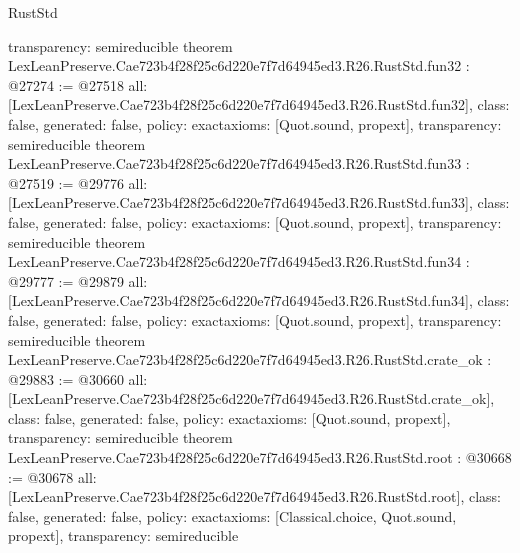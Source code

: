 \begin{lexlean}{RustStd}
\begin{coremodule}
{  transparency: semireducible
}
theorem LexLeanPreserve.Cae723b4f28f25c6d220e7f7d64945ed3.R26.RustStd.fun32 : @27274 := @27518 {
  all: [LexLeanPreserve.Cae723b4f28f25c6d220e7f7d64945ed3.R26.RustStd.fun32],
  class: false,
  generated: false,
  policy: exact{axioms: [Quot.sound, propext]},
  transparency: semireducible
}
theorem LexLeanPreserve.Cae723b4f28f25c6d220e7f7d64945ed3.R26.RustStd.fun33 : @27519 := @29776 {
  all: [LexLeanPreserve.Cae723b4f28f25c6d220e7f7d64945ed3.R26.RustStd.fun33],
  class: false,
  generated: false,
  policy: exact{axioms: [Quot.sound, propext]},
  transparency: semireducible
}
theorem LexLeanPreserve.Cae723b4f28f25c6d220e7f7d64945ed3.R26.RustStd.fun34 : @29777 := @29879 {
  all: [LexLeanPreserve.Cae723b4f28f25c6d220e7f7d64945ed3.R26.RustStd.fun34],
  class: false,
  generated: false,
  policy: exact{axioms: [Quot.sound, propext]},
  transparency: semireducible
}
theorem LexLeanPreserve.Cae723b4f28f25c6d220e7f7d64945ed3.R26.RustStd.crate_ok : @29883 := @30660 {
  all: [LexLeanPreserve.Cae723b4f28f25c6d220e7f7d64945ed3.R26.RustStd.crate_ok],
  class: false,
  generated: false,
  policy: exact{axioms: [Quot.sound, propext]},
  transparency: semireducible
}
theorem LexLeanPreserve.Cae723b4f28f25c6d220e7f7d64945ed3.R26.RustStd.root : @30668 := @30678 {
  all: [LexLeanPreserve.Cae723b4f28f25c6d220e7f7d64945ed3.R26.RustStd.root],
  class: false,
  generated: false,
  policy: exact{axioms: [Classical.choice, Quot.sound, propext]},
  transparency: semireducible
}


\end{coremodule}
\end{lexlean}
